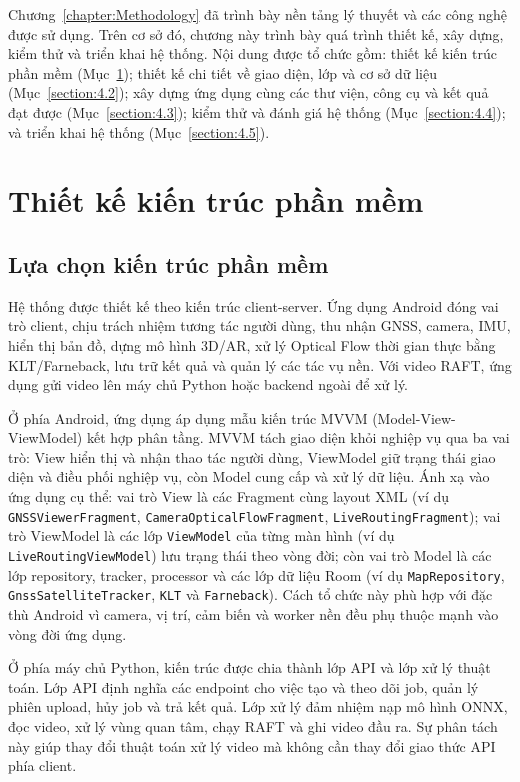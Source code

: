 \documentclass[../DoAn.tex]{subfiles}
\begin{document}
Chương~\ref{chapter:Methodology} đã trình bày nền tảng lý thuyết và các công nghệ được sử dụng. Trên cơ sở đó, chương này trình bày quá trình thiết kế, xây dựng, kiểm thử và triển khai hệ thống. Nội dung được tổ chức gồm: thiết kế kiến trúc phần mềm (Mục~\ref{section:4.1}); thiết kế chi tiết về giao diện, lớp và cơ sở dữ liệu (Mục~\ref{section:4.2}); xây dựng ứng dụng cùng các thư viện, công cụ và kết quả đạt được (Mục~\ref{section:4.3}); kiểm thử và đánh giá hệ thống (Mục~\ref{section:4.4}); và triển khai hệ thống (Mục~\ref{section:4.5}).

\section{Thiết kế kiến trúc phần mềm}
\label{section:4.1}
\subsection{Lựa chọn kiến trúc phần mềm}
\label{subsection:4.1.1}
Hệ thống được thiết kế theo kiến trúc client-server. Ứng dụng Android đóng vai trò client, chịu trách nhiệm tương tác người dùng, thu nhận GNSS, camera, IMU, hiển thị bản đồ, dựng mô hình 3D/AR, xử lý Optical Flow thời gian thực bằng KLT/Farneback, lưu trữ kết quả và quản lý các tác vụ nền. Với video RAFT, ứng dụng gửi video lên máy chủ Python hoặc backend ngoài để xử lý.

Ở phía Android, ứng dụng áp dụng mẫu kiến trúc MVVM (Model-View-ViewModel) kết hợp phân tầng. MVVM tách giao diện khỏi nghiệp vụ qua ba vai trò: View hiển thị và nhận thao tác người dùng, ViewModel giữ trạng thái giao diện và điều phối nghiệp vụ, còn Model cung cấp và xử lý dữ liệu. Ánh xạ vào ứng dụng cụ thể: vai trò View là các Fragment cùng layout XML (ví dụ \texttt{GNSSViewerFragment}, \texttt{CameraOpticalFlowFragment}, \texttt{LiveRoutingFragment}); vai trò ViewModel là các lớp \texttt{ViewModel} của từng màn hình (ví dụ \texttt{LiveRoutingViewModel}) lưu trạng thái theo vòng đời; còn vai trò Model là các lớp repository, tracker, processor và các lớp dữ liệu Room (ví dụ \texttt{MapRepository}, \texttt{GnssSatelliteTracker}, \texttt{KLT} và \texttt{Farneback}). Cách tổ chức này phù hợp với đặc thù Android vì camera, vị trí, cảm biến và worker nền đều phụ thuộc mạnh vào vòng đời ứng dụng.

Ở phía máy chủ Python, kiến trúc được chia thành lớp API và lớp xử lý thuật toán. Lớp API định nghĩa các endpoint cho việc tạo và theo dõi job, quản lý phiên upload, hủy job và trả kết quả. Lớp xử lý đảm nhiệm nạp mô hình ONNX, đọc video, xử lý vùng quan tâm, chạy RAFT và ghi video đầu ra. Sự phân tách này giúp thay đổi thuật toán xử lý video mà không cần thay đổi giao thức API phía client.
\end{document}

